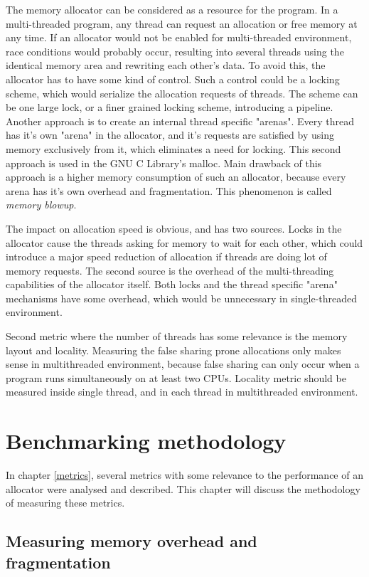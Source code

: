 The memory allocator can be considered as a resource for the program. In a multi-threaded program, any thread can request an allocation or free memory at any time. If an allocator would not be enabled for multi-threaded environment, race conditions would probably occur, resulting into several threads using the identical memory area and rewriting each other's data. To avoid this, the allocator has to have some kind of control. Such a control could be a locking scheme, which would serialize the allocation requests of threads. The scheme can be one large lock, or a finer grained locking scheme, introducing a pipeline. Another approach is to create an internal thread specific "arenas". Every thread has it's own "arena" in the allocator, and it's requests are satisfied by using memory exclusively from it, which eliminates a need for locking. This second approach is used in the GNU C Library's malloc. Main drawback of this approach is a higher memory consumption of such an allocator, because every arena has it's own overhead and fragmentation. This phenomenon is called {\em memory blowup}.

The impact on allocation speed is obvious, and has two sources. Locks in the allocator cause the threads asking for memory to wait for each other, which could introduce a major speed reduction of allocation if threads are doing lot of memory requests. The second source is the overhead of the multi-threading capabilities of the allocator itself. Both locks and the thread specific "arena" mechanisms have some overhead, which would be unnecessary in single-threaded environment.

Second metric where the number of threads has some relevance is the memory layout and locality. Measuring the false sharing prone allocations only makes sense in multithreaded environment, because false sharing can only occur when a program runs simultaneously on at least two CPUs. Locality metric should be measured inside single thread, and in each thread in multithreaded environment.

\chapter{Benchmarking methodology}
\label{methodology}

In chapter \ref{metrics}, several metrics with some relevance to the performance of an allocator were analysed and described. This chapter will discuss the methodology of measuring these metrics.

\section{Measuring memory overhead and fragmentation}
\label{methodology:fragmentation}

